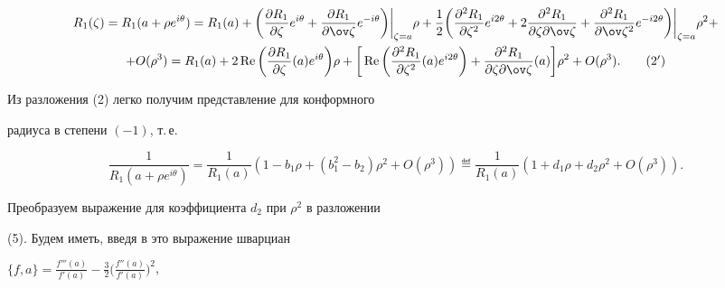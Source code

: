 \begin{multline} 


R_1(\zeta)=R_1(a+\rho e^{i\theta})=R_1(a)+\bigg( 


\frac{\partial R_1}{\partial\zeta}e^{i\theta}+ 


\frac{\partial R_1}{\partial\ov\zeta}e^{-i\theta}\bigg) 


\bigg|_{\zeta=a}\rho+\frac{1}{2}\bigg( 


\frac{\partial^2R_1}{\partial\zeta^2}e^{i2\theta}+2 


\frac{\partial^2R_1}{\partial\zeta \partial\ov\zeta}+ 


\frac{\partial^2R_1}{\partial\ov\zeta^2}e^{-i2\theta}\bigg)\bigg|_{\zeta=a} 


\rho^2+ \\ 


% 


+O(\rho^3)=R_1(a)+2\re\bigg(\frac{\partial R_1}{\partial\zeta} 


(a)e^{i\theta}\bigg)\rho+\bigg[\re\bigg( 


\frac{\partial^2R_1}{\partial\zeta^2}(a)e^{i2\theta}\bigg)+ 


\frac{\partial^2R_1}{\partial\zeta\partial\ov\zeta}(a) 


\bigg]\rho^2+O(\rho^3).\tag{2$'$} 


\end{multline} \addtocounter{equation}{-1}


 


Из разложения (2) легко получим представление для конформного 


радиуса в степени $(-1)$, т.\,е. 


\begin{equation} 


\frac{1}{R_1(a+\rho e^{i\theta})}=\frac{1}{R_1(a)} 


(1-b_1\rho+(b^2_1-b_2)\rho^2+O(\rho^3))\eqdef 


\frac{1}{R_1(a)}(1+d_1\rho+d_2\rho^2+O(\rho^3)). 


\end{equation} 


Преобразуем выражение для коэффициента $d_2$ при $\rho^2$ в разложении 


(5). Будем иметь, введя в это выражение шварциан 


$\{f,a\}=\frac{f'''(a)}{f'(a)}-\frac{3}{2}\big( 


\frac{f''(a)}{f'(a)}\big)^2$, 


